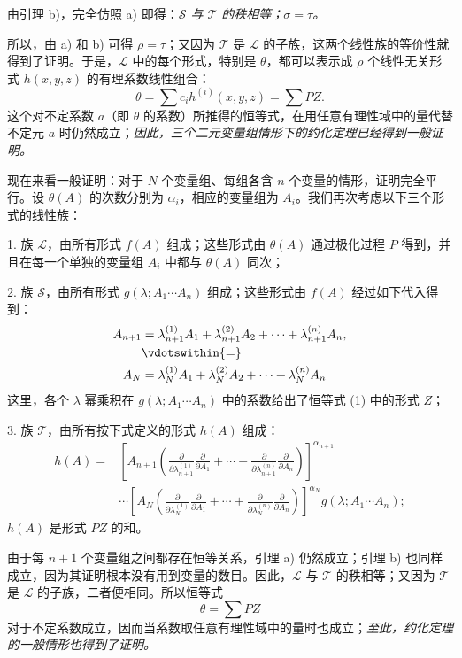 由引理 b)，完全仿照 a) 即得：\emph{$\mathcal S$ 与 $\mathcal T$ 的秩相等；$\sigma=\tau$。}

所以，由 a) 和 b) 可得 $\rho=\tau$；又因为 $\mathcal T$ 是 $\mathcal L$ 的子族，这两个线性族的等价性就得到了证明。于是，$\mathcal L$ 中的每个形式，特别是 $\theta$，都可以表示成 $\rho$ 个线性无关形式 $h(x,y,z)$ 的有理系数线性组合：
\[
  \theta=\sum c_i h^{(i)}(x,y,z)=\sum PZ.
\]
这个对不定系数 $a$（即 $\theta$ 的系数）所推得的恒等式，在用任意有理性域中的量代替不定元 $a$ 时仍然成立；\emph{因此，三个二元变量组情形下的约化定理已经得到一般证明。}

现在来看一般证明：对于 $N$ 个变量组、每组各含 $n$ 个变量的情形，证明完全平行。设 $\theta(A)$ 的次数分别为 $\alpha_i$，相应的变量组为 $A_i$。我们再次考虑以下三个形式的线性族：

1. 族 $\mathcal L$，由所有形式 $f(A)$ 组成；这些形式由 $\theta(A)$ 通过极化过程 $P$ 得到，并且在每一个单独的变量组 $A_i$ 中都与 $\theta(A)$ 同次；

2. 族 $\mathcal S$，由所有形式 $g(\lambda;A_1\cdots A_n)$ 组成；这些形式由 $f(A)$ 经过如下代入得到：
\[
\begin{aligned}
 A_{n+1}&=\lambda_{n+1}^{(1)}A_1+\lambda_{n+1}^{(2)}A_2+
        \cdots+\lambda_{n+1}^{(n)}A_n,\\
 &\vdotswithin{=}\\
 A_N&=\lambda_N^{(1)}A_1+\lambda_N^{(2)}A_2+
        \cdots+\lambda_N^{(n)}A_n
\end{aligned}
\]
这里，各个 $\lambda$ 幂乘积在 $g(\lambda;A_1\cdots A_n)$ 中的系数给出了恒等式 (1) 中的形式 $Z$；

3. 族 $\mathcal T$，由所有按下式定义的形式 $h(A)$ 组成：
\[
\begin{aligned}
 h(A)=&\left[A_{n+1}\left(
 \frac{\partial}{\partial\lambda_{n+1}^{(1)}}\frac{\partial}{\partial A_1}
 +\cdots+
 \frac{\partial}{\partial\lambda_{n+1}^{(n)}}\frac{\partial}{\partial A_n}\right)\right]^{\alpha_{n+1}} \\
&\cdots
\left[A_N\left(
 \frac{\partial}{\partial\lambda_N^{(1)}}\frac{\partial}{\partial A_1}
 +\cdots+
 \frac{\partial}{\partial\lambda_N^{(n)}}\frac{\partial}{\partial A_n}\right)\right]^{\alpha_N}
 g(\lambda;A_1\cdots A_n);
\end{aligned}
\]
$h(A)$ 是形式 $PZ$ 的和。

由于每 $n+1$ 个变量组之间都存在恒等关系，引理 a) 仍然成立；引理 b) 也同样成立，因为其证明根本没有用到变量的数目。因此，$\mathcal L$ 与 $\mathcal T$ 的秩相等；又因为 $\mathcal T$ 是 $\mathcal L$ 的子族，二者便相同。所以恒等式
\[
  \theta=\sum PZ
\]
对于不定系数成立，因而当系数取任意有理性域中的量时也成立；\emph{至此，约化定理的一般情形也得到了证明。}
